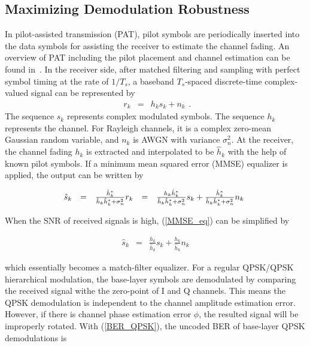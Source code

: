 \documentclass[conference]{IEEEtran}
\begin{document}
\subsection{Maximizing Demodulation Robustness}
In pilot-assisted transmission (PAT), pilot symbols are
periodically inserted into the data symbols for assisting the
receiver to estimate the channel fading. An overview of PAT
including the pilot placement and channel estimation can be found
in~\cite{Tong04}. In the receiver side, after matched filtering
and sampling with perfect symbol timing at the rate of $1/T_{s}$,
a baseband $T_s$-spaced discrete-time complex-valued signal can be
represented by
\begin{equation}
\begin{array}{rcl}
r_{k}&=&h_{k}s_{k}+n_{k}
\end{array}.
\end{equation}
\noindent The sequence $s_{k}$ represents complex modulated
symbols. The sequence $h_{k}$ represents the channel. For Rayleigh
channels, it is a complex zero-mean Gaussian random variable, and
$n_{k}$ is AWGN with variance $\sigma_{n}^2$. At the receiver, the
channel fading $h_{k}$ is extracted and interpolated to be
$\hat{h}_{k}$ with the help of known pilot symbols. If a minimum
mean squared error (MMSE) equalizer is applied, the output can be
written by

\begin{equation}\hspace{-0.05in}
\begin{array}{rcccl}
\hat{s}_{k}&=&\frac{\hat{h}^{\ast}_{k}}{\hat{h}_{k}\hat{h}_{k}^{\ast}+\sigma_{n}^{2}}r_{k}
&=&\frac{h_{k}\hat{h}^{\ast}_{k}}{\hat{h}_{k}\hat{h}_{k}^{\ast}+\sigma_{n}^{2}}s_{k}+\frac{\hat{h}^{\ast}_{k}}{\hat{h}_{k}\hat{h}_{k}^{\ast}+\sigma_{n}^{2}}n_{k}
\end{array}\label{MMSE_eq}
\end{equation}

\noindent When the SNR of received signals is high,
(\ref{MMSE_eq}) can be simplified by

\begin{equation}
\begin{array}{rcl}
\hat{s}_{k}&=&\frac{h_{k}}{\hat{h}_{k}}s_{k}+\frac{h_{k}}{\hat{h}_{k}}n_{k}
\end{array}\label{MF_eq}
\end{equation}

\noindent which essentially becomes a match-filter equalizer. For
a regular QPSK/QPSK hierarchical modulation, the base-layer
symbols are demodulated by comparing the received signal withe the
zero-point of I and Q channels. This means the QPSK demodulation
is independent to the channel amplitude estimation error. However,
if there is channel phase estimation error $\phi$, the resulted
signal will be improperly rotated. With (\ref{BER_QPSK}), the
uncoded BER of base-layer QPSK demodulations is
\end{document}
